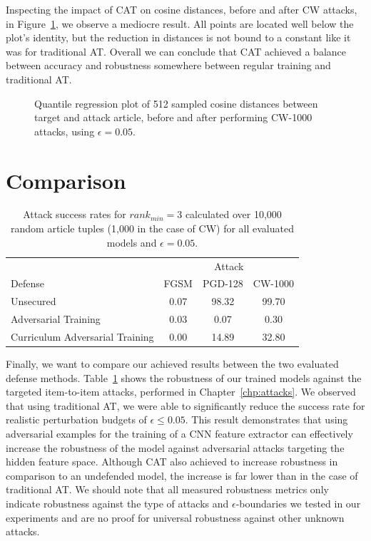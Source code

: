 Inspecting the impact of \ac{CAT} on cosine distances, before and after \ac{CW} attacks, in Figure~\ref{fig:curr-adv-quantile}, we observe a mediocre result. All points are located well below the plot's identity, but the reduction in distances is not bound to a constant like it was for traditional \ac{AT}. Overall we can conclude that \ac{CAT} achieved a balance between accuracy and robustness somewhere between regular training and traditional \ac{AT}.
\begin{figure}[H]
	\centering
	
	\caption{Quantile regression plot of 512 sampled cosine distances between target and attack article, before and after performing \acs{CW}-1000 attacks, using $\epsilon=0.05$.}
	\label{fig:curr-adv-quantile}
\end{figure}

\section{Comparison}

\begin{table}[H]
	\centering
	\begin{tabular}{ lccc } 
		\toprule		
		& \multicolumn{3}{c}{Attack} \\
		\cmidrule{2-4}
		Defense & FGSM & PGD-128 & CW-1000 \\
		\midrule
		Unsecured  						& 0.07  & 98.32 & 99.70 \\
		Adversarial Training			& 0.03  & 0.07  & 0.30 \\
		Curriculum Adversarial Training & 0.00  & 14.89 & 32.80 \\
		\bottomrule
	\end{tabular}
	\caption{Attack success rates for $rank_{min}=3$ calculated over 10,000 random article tuples (1,000 in the case of \acs{CW}) for all evaluated models and $\epsilon=0.05$.}
	\label{tab:defense-results}
\end{table}
Finally, we want to compare our achieved results between the two evaluated defense methods. Table~\ref{tab:defense-results} shows the robustness of our trained models against the targeted item-to-item attacks, performed in Chapter~\ref{chp:attacks}. We observed that using traditional \ac{AT}, we were able to significantly reduce the success rate for realistic perturbation budgets of $\epsilon\le0.05$. This result demonstrates that using adversarial examples for the training of a \ac{CNN} feature extractor can effectively increase the robustness of the model against adversarial attacks targeting the hidden feature space. Although \ac{CAT} also achieved to increase robustness in comparison to an undefended model, the increase is far lower than in the case of traditional \ac{AT}. We should note that all measured robustness metrics only indicate robustness against the type of attacks and $ \epsilon $-boundaries we tested in our experiments and are no proof for universal robustness against other unknown attacks.